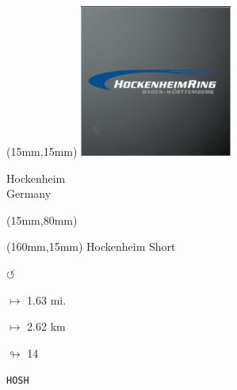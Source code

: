 \begin{textblock*}{50mm}(15mm,15mm)%
\includegraphics[width=50mm]{LG/2015-05-20_00082.png}
\par Hockenheim\\ Germany
\end{textblock*}
\begin{textblock*}{185mm}(15mm,80mm)%
\end{textblock*}
\begin{textblock*}{40mm}(160mm,15mm)%
Hockenheim Short
\par \Huge$\circlearrowleft$
\Large
\par$\mapsto$ 1.63 mi.
\par$\mapsto$ 2.62 km
\par$\looparrowright$ 14
\par\hfill\tiny\tt HOSH\\
\end{textblock*}
\null\newpage

